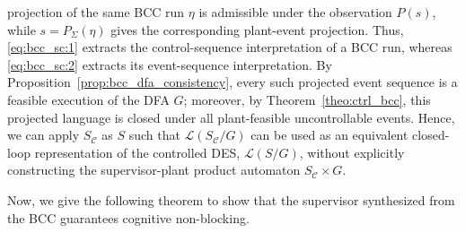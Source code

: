 \documentclass[journal,twoside,web]{ieeecolor}
\begin{document}
projection of the same BCC run $\eta$ is admissible under the observation $P(s)$, while $s=P_\Sigma(\eta)$ gives the corresponding plant-event
projection.
Thus, \eqref{eq:bcc_sc:1} extracts the control-sequence interpretation of a BCC run, whereas \eqref{eq:bcc_sc:2} extracts its event-sequence interpretation.
%
By Proposition~\ref{prop:bcc_dfa_consistency}, every such projected event sequence is a feasible execution of the DFA $G$; moreover, by
Theorem~\ref{theo:ctrl_bcc}, this projected language is closed under all plant-feasible uncontrollable events.
Hence, we can apply $S_\mathcal{C}$ as $S$ such that $\mathcal{L}(S_{\mathcal{C}}/G)$ can be used as an equivalent closed-loop representation of the controlled DES, $\mathcal{L}(S/G)$, without explicitly constructing the supervisor-plant product automaton $S_{\mathcal{C}}\times G$.

Now, we give the following theorem to show that the supervisor synthesized from the BCC guarantees cognitive non-blocking.
\end{document}
